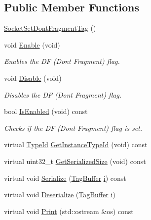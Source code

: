 \subsection*{Public Member Functions}
\begin{DoxyCompactItemize}
\item 
\hyperlink{classns3_1_1SocketSetDontFragmentTag_aa1abe9696a810feb1adec0184495ccef}{Socket\+Set\+Dont\+Fragment\+Tag} ()
\item 
void \hyperlink{classns3_1_1SocketSetDontFragmentTag_acb517ca05b009a3d65ae4d1fbc19ee6b}{Enable} (void)
\begin{DoxyCompactList}\small\item\em Enables the DF (Don\textquotesingle{}t Fragment) flag. \end{DoxyCompactList}\item 
void \hyperlink{classns3_1_1SocketSetDontFragmentTag_a51700538af5f6c83bdb1677306b52b1f}{Disable} (void)
\begin{DoxyCompactList}\small\item\em Disables the DF (Don\textquotesingle{}t Fragment) flag. \end{DoxyCompactList}\item 
bool \hyperlink{classns3_1_1SocketSetDontFragmentTag_a4f8c54df58c06849c931cc143c6da04a}{Is\+Enabled} (void) const 
\begin{DoxyCompactList}\small\item\em Checks if the DF (Don\textquotesingle{}t Fragment) flag is set. \end{DoxyCompactList}\item 
virtual \hyperlink{classns3_1_1TypeId}{Type\+Id} \hyperlink{classns3_1_1SocketSetDontFragmentTag_a6c1b5851f0b122aeec912b007fd02ec3}{Get\+Instance\+Type\+Id} (void) const 
\item 
virtual uint32\+\_\+t \hyperlink{classns3_1_1SocketSetDontFragmentTag_a5fb94826c27d92f42eac8597bd285d49}{Get\+Serialized\+Size} (void) const 
\item 
virtual void \hyperlink{classns3_1_1SocketSetDontFragmentTag_a6b237e19c8a138c1b3b22f161ee5cb14}{Serialize} (\hyperlink{classns3_1_1TagBuffer}{Tag\+Buffer} \hyperlink{lte__uplink__power__control_8m_a6f6ccfcf58b31cb6412107d9d5281426}{i}) const 
\item 
virtual void \hyperlink{classns3_1_1SocketSetDontFragmentTag_a99d3818dcd7408ec3d7dd69d375276a6}{Deserialize} (\hyperlink{classns3_1_1TagBuffer}{Tag\+Buffer} \hyperlink{lte__uplink__power__control_8m_a6f6ccfcf58b31cb6412107d9d5281426}{i})
\item 
virtual void \hyperlink{classns3_1_1SocketSetDontFragmentTag_a436889766ce5f99513d50c94ad0d5eeb}{Print} (std\+::ostream \&os) const 
\end{DoxyCompactItemize}
